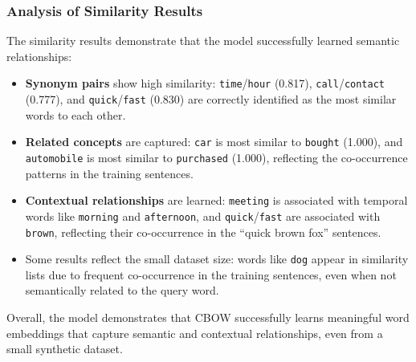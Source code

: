 \documentclass[11pt]{article}
\begin{document}
\subsubsection{Analysis of Similarity Results}

The similarity results demonstrate that the model successfully learned semantic relationships:

\begin{itemize}
  \item \textbf{Synonym pairs} show high similarity: \texttt{time}/\texttt{hour} (0.817), \texttt{call}/\texttt{contact} (0.777), and \texttt{quick}/\texttt{fast} (0.830) are correctly identified as the most similar words to each other.
  
  \item \textbf{Related concepts} are captured: \texttt{car} is most similar to \texttt{bought} (1.000), and \texttt{automobile} is most similar to \texttt{purchased} (1.000), reflecting the co-occurrence patterns in the training sentences.
  
  \item \textbf{Contextual relationships} are learned: \texttt{meeting} is associated with temporal words like \texttt{morning} and \texttt{afternoon}, and \texttt{quick}/\texttt{fast} are associated with \texttt{brown}, reflecting their co-occurrence in the ``quick brown fox'' sentences.
  
  \item Some results reflect the small dataset size: words like \texttt{dog} appear in similarity lists due to frequent co-occurrence in the training sentences, even when not semantically related to the query word.
\end{itemize}

Overall, the model demonstrates that CBOW successfully learns meaningful word embeddings that capture semantic and contextual relationships, even from a small synthetic dataset.
\end{document}
